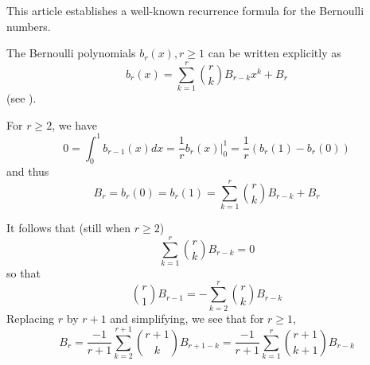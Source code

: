 \documentclass[12pt]{article}
\begin{document}
This article establishes a well-known recurrence formula for the Bernoulli numbers.

The Bernoulli polynomials $b_r(x), r\geq 1$ can be written explicitly as
\[b_r(x) = \sum_{k=1}^r \binom{r}{k}B_{r-k}x^k + B_r\]
(see ).

For $r\geq 2$, we have
\[0=\int_0^1 b_{r-1}(x)dx = \frac{1}{r}b_r(x)\big\lvert_0^1=\frac{1}{r}(b_r(1)-b_r(0))\]
and thus
\[B_r=b_r(0)=b_r(1)=\sum_{k=1}^r \binom{r}{k}B_{r-k} + B_r\]

It follows that (still when $r\geq 2$)
\[\sum_{k=1}^r \binom{r}{k}B_{r-k}=0\]
so that
\[\binom{r}{1}B_{r-1} = -\sum_{k=2}^r \binom{r}{k}B_{r-k}\]
Replacing $r$ by $r+1$ and simplifying, we see that for $r\geq 1$,
\[B_r = \frac{-1}{r+1}\sum_{k=2}^{r+1}\binom{r+1}{k}B_{r+1-k} = \frac{-1}{r+1}\sum_{k=1}^r\binom{r+1}{k+1}B_{r-k}\]

\end{document}
